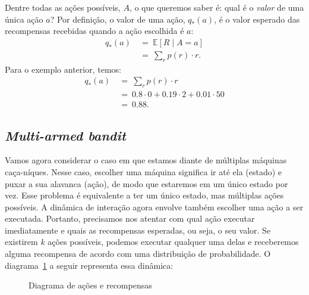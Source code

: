 \documentclass{article}
\begin{document}
            Dentre todas as ações possíveis, $A$, o que queremos saber é: qual é o \emph{valor} de uma única ação $a$? Por definição, o valor de uma ação, $q_*(a)$, é o valor esperado das recompensas recebidas quando a ação escolhida é $a$:
            \begin{equation}
            \begin{split}
                q_*(a) & \ = \ \mathbb{E}[R \mid A = a] \\
                & \ = \ \sum_{r}{} p(r) \cdot r .
            \end{split}
            \end{equation}        
            Para o exemplo anterior, temos:            
            \begin{equation*}
            \begin{split}
                q_*(a) & \ = \ \sum_{r}{} p(r) \cdot r \\
                & \ = \ 0.8 \cdot 0 + 0.19 \cdot 2 + 0.01 \cdot 50 \\
                & \ = \ 0.88 .
            \end{split}
            \end{equation*}
            
        \subsection{\emph{Multi-armed bandit}}
    
            Vamos agora considerar o caso em que estamos diante de múltiplas máquinas caça-níques. Nesse caso, escolher uma máquina significa ir até ela (estado) e puxar a sua alavanca (ação), de modo que estaremos em um único estado por vez. Esse problema é equivalente a ter um único estado, mas múltiplas ações possíveis. A dinâmica de interação agora envolve também escolher uma ação a ser executada. Portanto, precisamos nos atentar com qual ação executar imediatamente e quais as recompensas esperadas, ou seja, o seu valor. Se existirem $k$ ações possíveis, podemos executar qualquer uma delas e receberemos alguma recompensa de acordo com uma distribuição de probabilidade. O diagrama~\ref{diag:simple-bandit} a seguir representa essa dinâmica:
        
            \begin{figure}[ht]
                \centering
                \simplebandit
                \caption{Diagrama de ações e recompensas}
                \label{diag:simple-bandit}
            \end{figure}
                    
\end{document}
